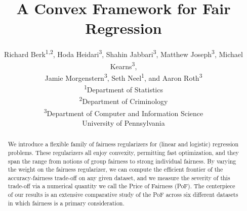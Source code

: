 \documentclass[11pt]{article}
\newcommand*{\affaddr}[1]{#1} %
\newcommand*{\affmark}[1][*]{\textsuperscript{#1}}
\begin{document}
\title{\Large\bfseries A Convex Framework for Fair Regression}
\author{
Richard Berk\affmark[1,2], Hoda Heidari\affmark[3], Shahin Jabbari\affmark[3], Matthew Joseph\affmark[3], Michael Kearns\affmark[3], \\
Jamie Morgenstern\affmark[3], Seth Neel\affmark[1], and Aaron Roth\affmark[3]\\
\affaddr{\affmark[1]Department of Statistics}\\
\affaddr{\affmark[2]Department of Criminology}\\
\affaddr{\affmark[3]Department of Computer and Information Science}\\
\affaddr{University of Pennsylvania}\\
}

\maketitle

\begin{abstract}
  We introduce a flexible family of fairness regularizers for (linear
  and logistic) regression problems. These regularizers all enjoy
  convexity, permitting fast optimization, and they span the range
  from notions of group fairness to strong individual
  fairness. By varying the weight on the fairness regularizer, we can
  compute the efficient frontier of the accuracy-fairness trade-off on
  any given dataset, and we measure the severity of this trade-off via
  a numerical quantity we call the Price of Fairness (PoF). The
  centerpiece of our results is an extensive comparative study of the
  PoF across six different datasets in which fairness is a primary
  consideration.
\end{abstract}














\appendix

\end{document}
